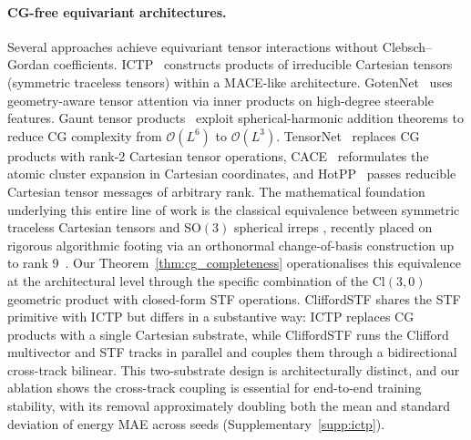 \paragraph{CG-free equivariant architectures.}
Several approaches achieve equivariant tensor interactions without Clebsch--Gordan coefficients. ICTP~\citep{zaverkin2024ictp} constructs products of irreducible Cartesian tensors (symmetric traceless tensors) within a MACE-like architecture. GotenNet~\citep{aykent2025gotennet} uses geometry-aware tensor attention via inner products on high-degree steerable features. Gaunt tensor products~\citep{luo2024gaunt} exploit spherical-harmonic addition theorems to reduce CG complexity from $\mathcal{O}(L^6)$ to $\mathcal{O}(L^3)$. TensorNet~\citep{simeon2023tensornet} replaces CG products with rank-2 Cartesian tensor operations, CACE~\citep{cheng2024cace} reformulates the atomic cluster expansion in Cartesian coordinates, and HotPP~\citep{wang2024n} passes reducible Cartesian tensor messages of arbitrary rank. The mathematical foundation underlying this entire line of work is the classical equivalence between symmetric traceless Cartesian tensors and $\mathrm{SO}(3)$ spherical irreps \citep{coope1965irreducible,applequist1989traceless,thorne1980multipole,stone2013theory}, recently placed on rigorous algorithmic footing via an orthonormal change-of-basis construction up to rank 9~\citep{shao2025orthonormal}. Our Theorem~\ref{thm:cg_completeness} operationalises this equivalence at the architectural level through the specific combination of the $\mathrm{Cl}(3,0)$ geometric product with closed-form STF operations. CliffordSTF shares the STF primitive with ICTP but differs in a substantive way: ICTP replaces CG products with a single Cartesian substrate, while CliffordSTF runs the Clifford multivector and STF tracks in parallel and couples them through a bidirectional cross-track bilinear. This two-substrate design is architecturally distinct, and our ablation shows the cross-track coupling is essential for end-to-end training stability, with its removal approximately doubling both the mean and standard deviation of energy MAE across seeds (Supplementary~\ref{supp:ictp}).

